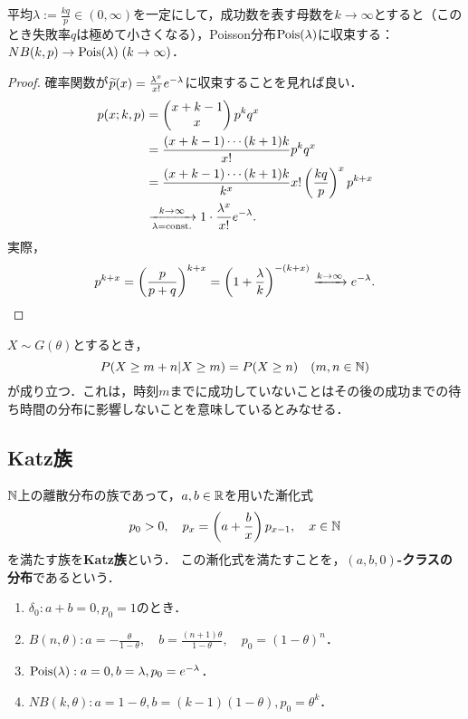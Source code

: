 \documentclass[uplatex,dvipdfmx]{jsreport}
\begin{document}
\begin{proposition}[Poisson近似]
    平均$\lambda:=\frac{kq}{p}\in(0,\infty)$を一定にして，成功数を表す母数を$k\to\infty$とすると（このとき失敗率$q$は極めて小さくなる），Poisson分布$\mathrm{Pois}(\lambda)$に収束する：$NB(k,p)\to\mathrm{Pois}(\lambda)\;(k\to\infty)$．
\end{proposition}
\begin{proof}
    確率関数が$\widetilde{p}(x)=\frac{\lambda^x}{x!}e^{-\lambda}$に収束することを見れば良い．
    \begin{align*}
        p(x;k,p)&=\begin{pmatrix}x+k-1\\x\end{pmatrix}p^kq^x\\
        &=\frac{(x+k-1)\cdots(k+1)k}{x!}p^kq^x\\
        &=\frac{(x+k-1)\cdots(k+1)k}{k^x}x!\left(\frac{kq}{p}\right)^xp^{k+x}\\
        &\xrightarrow[\lambda=\mathrm{const.}]{k\to\infty}1\cdot\frac{\lambda^x}{x!}e^{-\lambda}.
    \end{align*}
    実際，
    \[p^{k+x}=\left(\frac{p}{p+q}\right)^{k+x}=\left(1+\frac{\lambda}{k}\right)^{-(k+x)}\xrightarrow{k\to\infty}e^{-\lambda}.\]
\end{proof}

\begin{remark}[幾何分布の無記憶性]
    $X\sim G(\theta)$とするとき，
    \[P(X\ge m+n|X\ge m)=P(X\ge n)\quad(m,n\in\mathbb{N})\]
    が成り立つ．これは，時刻$m$までに成功していないことはその後の成功までの待ち時間の分布に影響しないことを意味しているとみなせる．
\end{remark}

\subsection{Katz族}

\begin{definition}
    $\mathbb{N}$上の離散分布の族であって，$a,b\in\mathbb{R}$を用いた漸化式
    \[p_0>0,\quad p_x=\left(a+\frac{b}{x}\right)p_{x-1},\quad x\in\mathbb{N}\]
    を満たす族を\textbf{Katz族}という．
    この漸化式を満たすことを，\textbf{$(a,b,0)$-クラスの分布}であるという．
\end{definition}
\begin{example}\mbox{}
    \begin{enumerate}
        \item $\delta_0:a+b=0,p_0=1$のとき．
        \item $B(n,\theta):a=-\frac{\theta}{1-\theta},\quad b=\frac{(n+1)\theta}{1-\theta},\quad p_0=(1-\theta)^n$．
        \item $\mathrm{Pois}(\lambda):a=0,b=\lambda,p_0=e^{-\lambda}$．
        \item $NB(k,\theta):a=1-\theta,b=(k-1)(1-\theta),p_0=\theta^k$．
    \end{enumerate}
\end{example}
\end{document}
